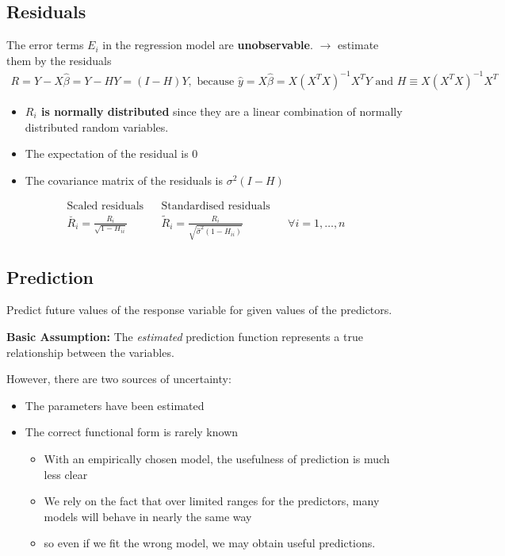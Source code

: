\subsection{Residuals}
The error terms $E_i$ in the regression model are \textbf{unobservable}.
$\rightarrow$ estimate them by the residuals
\begin{align*}
R
=
Y - X \widehat{\beta}
=
Y - H Y
=
(I - H) Y
, \text{ because }
\widehat{y} =
X \widehat{\beta}
=
X (X^T X)^{-1} X^T Y
\text{ and }
H
\equiv
X (X^T X)^{-1} X^T
\end{align*}
\begin{itemize}
\item \textbf{$R_i$ is normally distributed} since they are a linear
combination of normally distributed random variables.
\item The expectation of the residual is 0
\item The covariance matrix of the residuals is $\sigma^2 (I - H)$
\end{itemize}
\begin{align*}
\text{Scaled residuals}
 &  &
\text{Standardised residuals}
\\
\breve{R_i}
=
\frac{R_i}{\sqrt{1-H_{ii}}}
 &  &
\widetilde{R}_i
=
\frac{R_i}{\sqrt{\widehat{\sigma}^2 (1 - H_{ii})}}
 &  &
\forall i=1,\ldots,n
\end{align*}

\subsection{Prediction}
Predict future values of the response variable for given values of the
predictors.

\textbf{Basic Assumption:} The \textit{estimated} prediction function
represents a true relationship between the variables.

However, there are two sources of uncertainty:
\begin{itemize}
\item The parameters have been estimated
\item The correct functional form is rarely known
\begin{itemize}
\item With an empirically chosen model, the usefulness of prediction is much
less clear
\item We rely on the fact that over limited ranges for the predictors, many
models will behave in nearly the same way
\item so even if we fit the wrong model, we may obtain useful
predictions.
\end{itemize}
\end{itemize}

